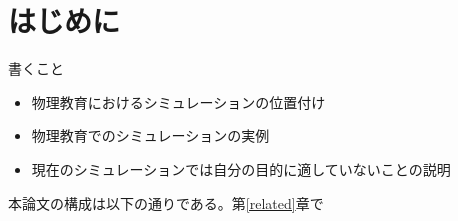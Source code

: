 \chapter{はじめに} \label{first}

書くこと

\begin{itemize}
\item {
  物理教育におけるシミュレーションの位置付け
}
\item {
  物理教育でのシミュレーションの実例
}
\item {
  現在のシミュレーションでは自分の目的に適していないことの説明
}
\end{itemize}

本論文の構成は以下の通りである。第\ref{related}章で
